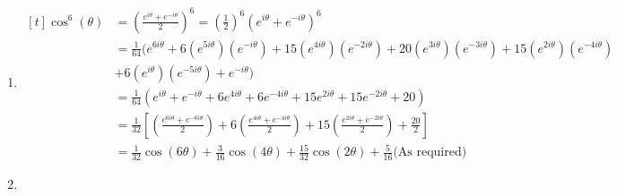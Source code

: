 \documentclass[../main.tex]{subfiles}
\begin{document}
\begin{enumerate}
    \item
    $
    \!
    \begin{aligned}[t]
     \cos^6(\theta)
        &=(\frac{e^{i\theta}+e^{-i\theta}}{2})^6= (\frac{1}{2})^6(e^{i\theta}+e^{-i\theta})^6 \\
        &= \frac{1}{64}(e^{6i\theta}+6(e^{5i\theta})(e^{-i\theta})+15(e^{4i\theta})(e^{-2i\theta})+20(e^{3i\theta})(e^{-3i\theta})+15(e^{2i\theta})(e^{-4i\theta})\\
        &+6(e^{i\theta})(e^{-5i\theta})+e^{-i\theta})\\
        &=\frac{1}{64}(e^{i\theta}+e^{-i\theta}+6e^{4i\theta}+6e^{-4i\theta}+15e^{2i\theta}+15e^{-2i\theta}+20)\\
        &=\frac{1}{32}[(\frac{e^{6i\theta}+e^{-6i\theta}}{2})+6(\frac{e^{4i\theta}+e^{-4i\theta}}{2})+15(\frac{e^{2i\theta}+e^{-2i\theta}}{2})+\frac{20}{2}]\\
        &=\frac{1}{32}\cos(6\theta)+\frac{3}{16}\cos(4\theta)+\frac{15}{32}\cos(2\theta)+\frac{5}{16} \text{(As required)}
    \end{aligned}
    $

    \item 
    
\end{enumerate}
\end{document}
